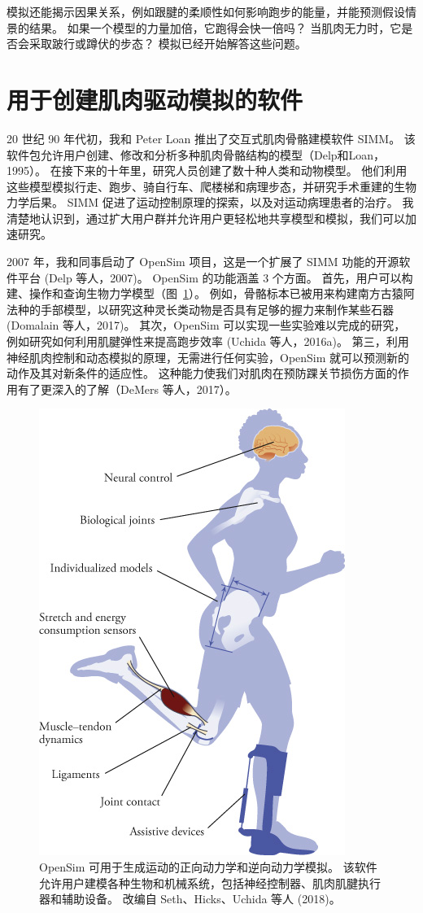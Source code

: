 模拟还能揭示因果关系，例如跟腱的柔顺性如何影响跑步的能量，并能预测假设情景的结果。
如果一个模型的力量加倍，它跑得会快一倍吗？
当肌肉无力时，它是否会采取跛行或蹲伏的步态？
模拟已经开始解答这些问题。



\section{用于创建肌肉驱动模拟的软件}

20 世纪 90 年代初，我和 Peter Loan 推出了交互式肌肉骨骼建模软件 SIMM。
该软件包允许用户创建、修改和分析多种肌肉骨骼结构的模型（Delp和Loan，1995）。
在接下来的十年里，研究人员创建了数十种人类和动物模型。
他们利用这些模型模拟行走、跑步、骑自行车、爬楼梯和病理步态，并研究手术重建的生物力学后果。
SIMM 促进了运动控制原理的探索，以及对运动病理患者的治疗。
我清楚地认识到，通过扩大用户群并允许用户更轻松地共享模型和模拟，我们可以加速研究。


2007 年，我和同事启动了 OpenSim 项目，这是一个扩展了 SIMM 功能的开源软件平台 (Delp 等人，2007)。
OpenSim 的功能涵盖 3 个方面。
首先，用户可以构建、操作和查询生物力学模型（图~\ref{fig:10_14}）。
例如，骨骼标本已被用来构建南方古猿阿法种的手部模型，以研究这种灵长类动物是否具有足够的握力来制作某些石器 (Domalain 等人，2017)。
其次，OpenSim 可以实现一些实验难以完成的研究，例如研究如何利用肌腱弹性来提高跑步效率 (Uchida 等人，2016a)。
第三，利用神经肌肉控制和动态模拟的原理，无需进行任何实验，OpenSim 就可以预测新的动作及其对新条件的适应性。
这种能力使我们对肌肉在预防踝关节损伤方面的作用有了更深入的了解（DeMers 等人，2017）。


\begin{figure}[!htb]
	\centering
	\includegraphics[width=0.7\linewidth]{chap10/10_14}
	\caption{OpenSim 可用于生成运动的正向动力学和逆向动力学模拟。
		该软件允许用户建模各种生物和机械系统，包括神经控制器、肌肉肌腱执行器和辅助设备。
		改编自 Seth、Hicks、Uchida 等人 (2018)。 \label{fig:10_14}}
\end{figure}


